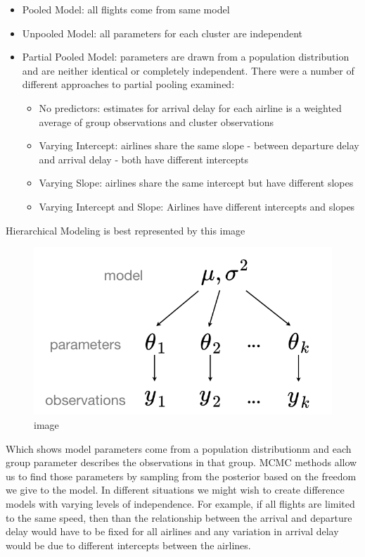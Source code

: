 \documentclass[11pt]{article}
\makeatletter
\def\maxwidth{\ifdim\Gin@nat@width>\linewidth\linewidth
    \else\Gin@nat@width\fi}
\let\Oldincludegraphics\includegraphics
\renewcommand{\includegraphics}[1]{\Oldincludegraphics[width=.8\maxwidth]{#1}}
\providecommand{\tightlist}{%
      \setlength{\itemsep}{0pt}\setlength{\parskip}{0pt}}
\makeatother
\begin{document}
\begin{itemize}
\item
  Pooled Model: all flights come from same model
\item
  Unpooled Model: all parameters for each cluster are independent
\item
  Partial Pooled Model: parameters are drawn from a population
  distribution and are neither identical or completely independent.
  There were a number of different approaches to partial pooling
  examined:

  \begin{itemize}
  \tightlist
  \item
    No predictors: estimates for arrival delay for each airline is a
    weighted average of group observations and cluster observations
  \item
    Varying Intercept: airlines share the same slope - between departure
    delay and arrival delay - both have different intercepts
  \item
    Varying Slope: airlines share the same intercept but have different
    slopes
  \item
    Varying Intercept and Slope: Airlines have different intercepts and
    slopes
  \end{itemize}
\end{itemize}

Hierarchical Modeling is best represented by this image

\begin{figure}
\centering
\includegraphics{images/hierarchical.png}
\caption{image}
\end{figure}

Which shows model parameters come from a population distributionm and
each group parameter describes the observations in that group. MCMC
methods allow us to find those parameters by sampling from the posterior
based on the freedom we give to the model. In different situations we
might wish to create difference models with varying levels of
independence. For example, if all flights are limited to the same speed,
then than the relationship between the arrival and departure delay would
have to be fixed for all airlines and any variation in arrival delay
would be due to different intercepts between the airlines.
\end{document}
